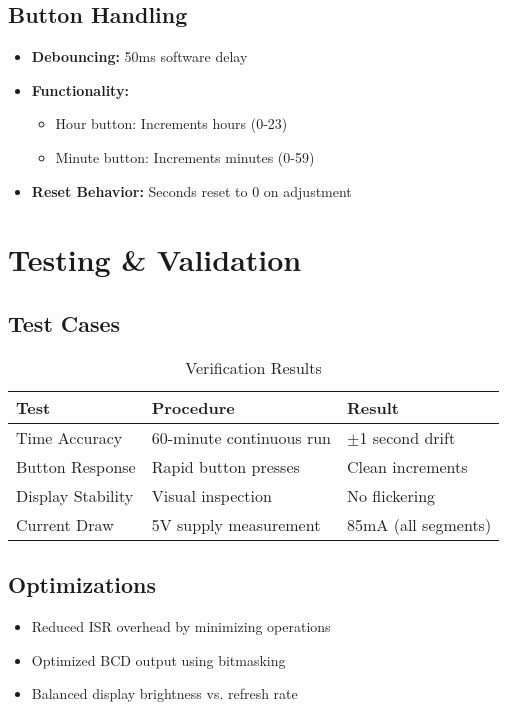 \documentclass[journal]{IEEEtran}
\begin{document}
\subsection{Button Handling}
\begin{itemize}
    \item \textbf{Debouncing:} 50ms software delay
    \item \textbf{Functionality:}
    \begin{itemize}
        \item Hour button: Increments hours (0-23)
        \item Minute button: Increments minutes (0-59)
    \end{itemize}
    \item \textbf{Reset Behavior:} Seconds reset to 0 on adjustment
\end{itemize}

\section{Testing \& Validation}

\subsection{Test Cases}
\begin{table}[h]
\centering
\caption{Verification Results}
\begin{tabularx}{\textwidth}{lXl}
\toprule
\textbf{Test} & \textbf{Procedure} & \textbf{Result} \\
\midrule
Time Accuracy & 60-minute continuous run & $\pm$1 second drift \\
Button Response & Rapid button presses & Clean increments \\
Display Stability & Visual inspection & No flickering \\
Current Draw & 5V supply measurement & 85mA (all segments) \\
\bottomrule
\end{tabularx}
\end{table}

\subsection{Optimizations}
\begin{itemize}
    \item Reduced ISR overhead by minimizing operations
    \item Optimized BCD output using bitmasking
    \item Balanced display brightness vs. refresh rate
\end{itemize}
\end{document}
